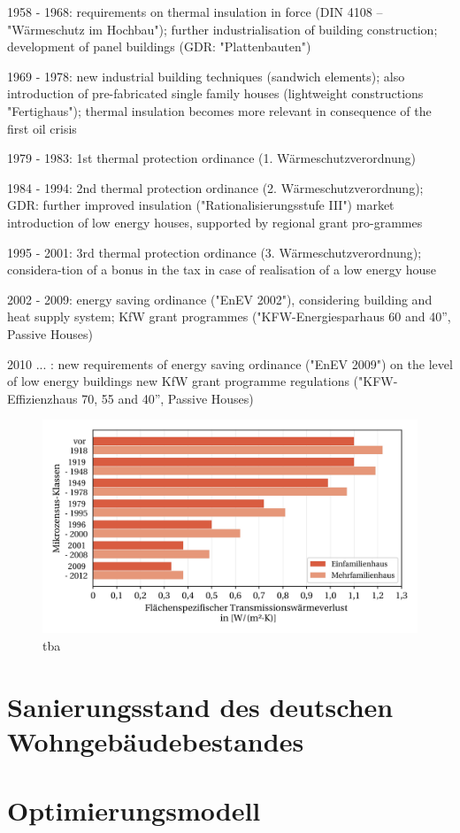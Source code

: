 1958 - 1968: requirements on thermal insulation in force (DIN 4108 – "Wärmeschutz im Hochbau"); further industrialisation of building construction; development of panel buildings (GDR: "Plattenbauten")

1969 - 1978: new industrial building techniques (sandwich elements); also introduction of pre-fabricated single family houses (lightweight constructions "Fertighaus"); thermal insulation becomes more relevant in consequence of the first oil crisis

1979 - 1983: 1st thermal protection ordinance (1. Wärmeschutzverordnung)

1984 - 1994: 2nd thermal protection ordinance (2. Wärmeschutzverordnung); GDR: further improved insulation ("Rationalisierungsstufe III")
market introduction of low energy houses, supported by regional grant pro-grammes

1995 - 2001: 3rd thermal protection ordinance (3. Wärmeschutzverordnung); considera-tion of a bonus in the tax in case of realisation of a low energy house

2002 - 2009: energy saving ordinance ("EnEV 2002"), considering building and heat supply system; KfW grant programmes ("KFW-Energiesparhaus 60 and 40”, Passive Houses)

2010 ... : new requirements of energy saving ordinance ("EnEV 2009") on the level of low energy buildings
new KfW grant programme regulations ("KFW-Effizienzhaus 70, 55 and 40”, Passive Houses)

\begin{figure}[H]
	\centering
		\includegraphics{Pictures/TransmissionswaermekoeffizientBaujahr.jpg}
	\caption{tba}
	\label{fig: Abbildung221} 
\end{figure}

\section{Sanierungsstand des deutschen Wohngebäudebestandes}
\label{sec:Sektion 23}


\section{Optimierungsmodell}
\label{sec:Sektion 24}



